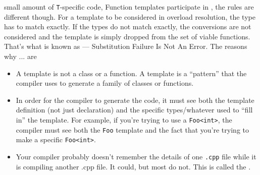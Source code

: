 small amount of \texttt{T}-specific code, 
\newline
Function templates participate in , 
the rules are different though. For a template to be considered in overload 
resolution, the type has to match exactly. If the types do not match exactly, 
the conversions are not considered and the template is simply dropped 
from the set of viable functions. That’s what is known as  — 
Substitution Failure Is Not An Error.
\newline
The reasons why ... are 
\begin{itemize}
    \item A template is not a class or a function. A template is a “pattern” 
          that the compiler uses to generate a family of classes or functions.
    \item In order for the compiler to generate the code, it must see both 
          the template definition (not just declaration) and the specific 
          types/whatever used to “fill in” the template. For example, 
          if you’re trying to use a \texttt{Foo<int>}, the compiler must 
          see both the \texttt{Foo} template and the fact that you’re 
          trying to make a specific \texttt{Foo<int>}.
    \item Your compiler probably doesn’t remember the details of one \texttt{.cpp} 
          file while it is compiling another .cpp file. It could, but most 
          do not.
          \newline
          This is called the .
\end{itemize}

